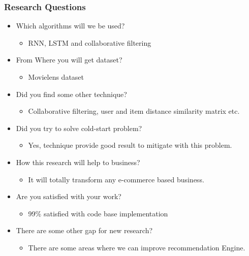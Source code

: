 \documentclass{beamer}
\begin{document}
\begin{frame}
\frametitle{Research Questions}
\begin{minipage}{\textwidth}
	\begin{itemize}
    	\item Which algorithms will we be used?
    	\begin{itemize}
    	\item RNN, LSTM and collaborative filtering
    	\end{itemize}
    	
    	\item From Where you will get dataset?
    	\begin{itemize}
    	\item Movielens dataset
    	\end{itemize}
    	
    	\item Did you find some other technique?
    	\begin{itemize}
    	\item Collaborative filtering, user and item distance similarity matrix etc.
    	\end{itemize}
    	
    	\item Did you try to solve cold-start problem?
    	\begin{itemize}
    	\item Yes, technique provide good result to mitigate with this problem.
    	\end{itemize}
    	
    	\item How this research will help to business?
    	\begin{itemize}
    	\item It will totally transform any e-commerce based business.

    	\end{itemize}
    	
    	\item Are you satisfied with your work?
    	\begin{itemize}
    	\item 99\% satisfied with code base implementation 
    	\end{itemize}
    	
    	\item There are some other gap for new research?
    	\begin{itemize}
    	\item There are some areas where we can improve recommendation Engine.

    	\end{itemize}
    	
    	
      
    \end{itemize}
\end{minipage}
\end{frame} 
\end{document}
